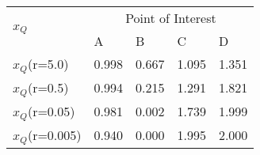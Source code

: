 \documentclass{standalone}
\newcommand{\xQ}{$x_Q$} %
\begin{document}
    \begin{table}[]
    \centering
    \footnotesize
    \begin{tabular}{@{}lllll@{}}
    \toprule
    \multirow{2}{*}{\xQ} & \multicolumn{4}{c}{Point of Interest} \\ \cmidrule(l){2-5} 
     & A & B & C & D \\ \cmidrule(r){1-1}
    \xQ(r=5.0) & 0.998 & 0.667 & 1.095 & 1.351 \\
    \xQ(r=0.5) & 0.994 & 0.215 & 1.291 & 1.821 \\
    \xQ(r=0.05) & 0.981 & 0.002 & 1.739 & 1.999 \\
    \xQ(r=0.005) & 0.940 & 0.000 & 1.995 & 2.000 \\ \bottomrule
    \end{tabular}
    \end{table}
\end{document}
